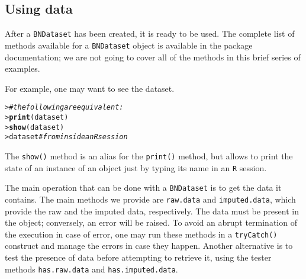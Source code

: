 \documentclass{article}\usepackage[]{graphicx}\usepackage[]{color}
\makeatletter
\newcommand{\hlcom}[1]{\textcolor[rgb]{0.678,0.584,0.686}{\textit{#1}}}%
\newcommand{\hlstd}[1]{\textcolor[rgb]{0.345,0.345,0.345}{#1}}%
\newcommand{\hlkwd}[1]{\textcolor[rgb]{0.737,0.353,0.396}{\textbf{#1}}}%
\newenvironment{kframe}{%
 \def\at@end@of@kframe{}%
 \ifinner\ifhmode%
  \def\at@end@of@kframe{\end{minipage}}%
  \begin{minipage}{\columnwidth}%
 \fi\fi%
 \def\FrameCommand##1{\hskip\@totalleftmargin \hskip-\fboxsep
 \colorbox{shadecolor}{##1}\hskip-\fboxsep
     \hskip-\linewidth \hskip-\@totalleftmargin \hskip\columnwidth}%
 \MakeFramed {\advance\hsize-\width
   \@totalleftmargin\z@ \linewidth\hsize
   \@setminipage}}%
 {\par\unskip\endMakeFramed%
 \at@end@of@kframe}
\newenvironment{knitrout}{}{} %
\newcommand{\Robject}[1]{{\texttt{#1}}}
\newcommand{\Rmethod}[1]{{\texttt{#1}}}
\makeatother
\begin{document}
\subsection{Using data}
\label{sec:usingdata}
After a \Robject{BNDataset} has been created, it is ready to be used.
The complete list of methods available for a \Robject{BNDataset} object is available
in the package documentation; we are not going to cover all of the methods in this brief series
of examples.

For example, one may want to see the dataset.
\begin{knitrout}
\color{fgcolor}\begin{kframe}
\begin{alltt}
\hlstd{> }\hlcom{# the following are equivalent:}
\hlstd{> }\hlkwd{print}\hlstd{(dataset)}
\hlstd{> }\hlkwd{show}\hlstd{(dataset)}
\hlstd{> }\hlstd{dataset} \hlcom{# from inside an R session}
\end{alltt}
\end{kframe}
\end{knitrout}
The \Rmethod{show()} method is an alias for the \Rmethod{print()} method, but allows to print the state of an instance of an object
just by typing its name in an \texttt{R} session.

The main operation that can be done with a \Robject{BNDataset} is to get the data it contains.
The main methods we provide are \Rmethod{raw.data} and \Rmethod{imputed.data}, which provide the raw and the
imputed data, respectively. The data must be present in the object; conversely, an error will be raised.
To avoid an abrupt termination of the execution in case of error, one may run these methods in a
\Rmethod{tryCatch()} construct and manage the errors in case they happen. Another alternative is to test
the presence of data before attempting to retrieve it, using the tester methods \Rmethod{has.raw.data} and
\Rmethod{has.imputed.data}.
\end{document}
